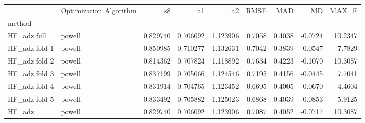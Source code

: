 \begin{tabular}{llrrrrrrr}
 & Optimization Algorithm & s8 & a1 & a2 & RMSE & MAD & MD & MAX_E \\
method &  &  &  &  &  &  &  &  \\
HF_adz full & powell & 0.829740 & 0.706092 & 1.123906 & 0.7058 & 0.4038 & -0.0724 & 10.2347 \\
HF_adz fold 1 & powell & 0.850985 & 0.710277 & 1.132631 & 0.7042 & 0.3839 & -0.0547 & 7.7829 \\
HF_adz fold 2 & powell & 0.814362 & 0.707824 & 1.118892 & 0.7634 & 0.4223 & -0.1070 & 10.3087 \\
HF_adz fold 3 & powell & 0.837199 & 0.705066 & 1.124546 & 0.7195 & 0.4156 & -0.0445 & 7.7041 \\
HF_adz fold 4 & powell & 0.831914 & 0.704765 & 1.123452 & 0.6695 & 0.4005 & -0.0670 & 4.4604 \\
HF_adz fold 5 & powell & 0.833492 & 0.705882 & 1.125023 & 0.6868 & 0.4039 & -0.0853 & 5.9125 \\
HF_adz & powell & 0.829740 & 0.706092 & 1.123906 & 0.7087 & 0.4052 & -0.0717 & 10.3087 \\
\end{tabular}

